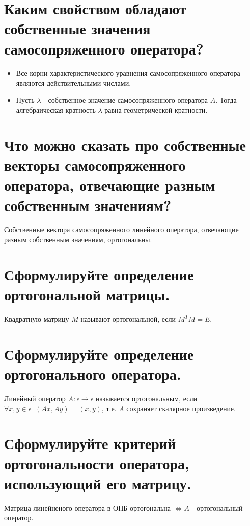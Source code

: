 \documentclass{article}
\begin{document}
\section{Каким свойством обладают собственные значения самосопряженного оператора?}
\begin{itemize}
    \item Все корни характеристического уравнения самосопряженного
    оператора являются действительными числами.
    \item Пусть $\lambda$ - собственное значение самосопряженного
    оператора $A$. Тогда алгебраическая кратность $\lambda$ равна
    геометрической кратности.
\end{itemize}

\section{Что можно сказать про собственные векторы самосопряженного оператора, отвечающие разным собственным значениям?}
Собственные вектора самосопряженного
линейного оператора, отвечающие 
разным собственным значениям, ортогональны.

\section{Сформулируйте определение ортогональной матрицы.}
Квадратную матрицу $M$ называют ортогональной,
если $M^T M = E$.

\section{Сформулируйте определение ортогонального оператора.}
Линейный оператор $A: \epsilon \longrightarrow \epsilon$ называется
ортогональным, если $\forall x, y \in \epsilon \;\; (Ax, Ay) = (x, y)$,
т.е. $A$ сохраняет скалярное произведение.

\section{Сформулируйте критерий ортогональности оператора, использующий его матрицу.}
Матрица линейненого оператора в ОНБ ортогональна $\iff A$ - ортогональный оператор. 
\end{document}
